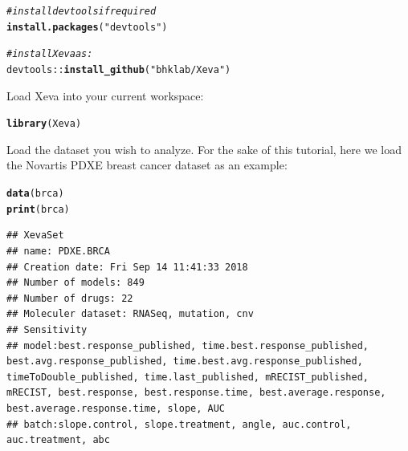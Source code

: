\documentclass{article}\usepackage[]{graphicx}\usepackage[]{xcolor}
\makeatletter
\newcommand{\hlstr}[1]{\textcolor[rgb]{0.192,0.494,0.8}{#1}}%
\newcommand{\hlcom}[1]{\textcolor[rgb]{0.678,0.584,0.686}{\textit{#1}}}%
\newcommand{\hlopt}[1]{\textcolor[rgb]{0,0,0}{#1}}%
\newcommand{\hlstd}[1]{\textcolor[rgb]{0.345,0.345,0.345}{#1}}%
\newcommand{\hlkwd}[1]{\textcolor[rgb]{0.737,0.353,0.396}{\textbf{#1}}}%
\newenvironment{kframe}{%
 \def\at@end@of@kframe{}%
 \ifinner\ifhmode%
  \def\at@end@of@kframe{\end{minipage}}%
  \begin{minipage}{\columnwidth}%
 \fi\fi%
 \def\FrameCommand##1{\hskip\@totalleftmargin \hskip-\fboxsep
 \colorbox{shadecolor}{##1}\hskip-\fboxsep
     \hskip-\linewidth \hskip-\@totalleftmargin \hskip\columnwidth}%
 \MakeFramed {\advance\hsize-\width
   \@totalleftmargin\z@ \linewidth\hsize
   \@setminipage}}%
 {\par\unskip\endMakeFramed%
 \at@end@of@kframe}
\newenvironment{knitrout}{}{} %
\makeatother
\begin{document}
\begin{knitrout}
\color{fgcolor}\begin{kframe}
\begin{alltt}
\hlcom{#install devtools if required}
\hlkwd{install.packages}\hlstd{(}\hlstr{"devtools"}\hlstd{)}

\hlcom{#install Xeva as:}
\hlstd{devtools}\hlopt{::}\hlkwd{install_github}\hlstd{(}\hlstr{"bhklab/Xeva"}\hlstd{)}
\end{alltt}
\end{kframe}
\end{knitrout}


Load Xeva into your current workspace:
\begin{knitrout}
\color{fgcolor}\begin{kframe}
\begin{alltt}
\hlkwd{library}\hlstd{(Xeva)}
\end{alltt}
\end{kframe}
\end{knitrout}



Load the dataset you wish to analyze. For the sake of this tutorial, here we load the Novartis PDXE \cite{gao2015high} breast cancer dataset as an example:
\begin{knitrout}
\color{fgcolor}\begin{kframe}
\begin{alltt}
\hlkwd{data}\hlstd{(brca)}
\hlkwd{print}\hlstd{(brca)}
\end{alltt}
\begin{verbatim}
## XevaSet
## name: PDXE.BRCA
## Creation date: Fri Sep 14 11:41:33 2018
## Number of models: 849
## Number of drugs: 22
## Moleculer dataset: RNASeq, mutation, cnv
## Sensitivity
## model:best.response_published, time.best.response_published, best.avg.response_published, time.best.avg.response_published, timeToDouble_published, time.last_published, mRECIST_published, mRECIST, best.response, best.response.time, best.average.response, best.average.response.time, slope, AUC
## batch:slope.control, slope.treatment, angle, auc.control, auc.treatment, abc
\end{verbatim}
\end{kframe}
\end{knitrout}
\end{document}
